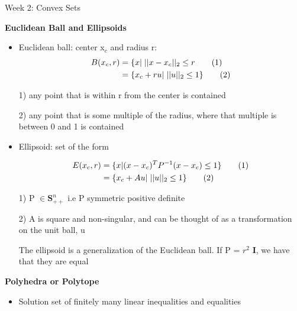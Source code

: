 \documentclass{article}
\begin{document}
\begin{homeworkProblemName}{{\LARGE Week 2: Convex Sets}}
\begin{problemAnswer}
{\begin{itemize}
      \end{itemize}
    }\end{problemAnswer}

  \clearpage

  \vspace{0.2 cm} \textbf{\large Euclidean Ball and Ellipsoids}

  \begin{problemAnswer}{
      \begin{itemize}
      \item Euclidean ball: center x$_c$ and radius r:
        \begin{align*}
          B(x_c, r) &= \{x | \hspace{0.1 cm} ||x-x_c||_2 \leq r \tag{1}\\
                    &= \{x_c + ru | \hspace{0.1 cm} ||u||_2 \leq 1\} \tag{2}\\
        \end{align*}

        1) any point that is within r from the center is contained

        2) any point that is some multiple of the radius, where that multiple is
        between 0 and 1 is contained

      \item Ellipsoid: set of the form

        \begin{align*}
          E(x_c, r) &= \{x | (x - x_c)^TP^{-1}(x-x_c) \leq 1\} \tag{1}\\
                    &= \{x_c + Au | \hspace{0.1 cm} ||u||_2 \leq 1\} \tag{2}\\
        \end{align*}

        1) P $\in \bm{S}^n_{++}$ i.e P symmetric positive definite

        2) A is square and non-singular, and can be thought of as a
        transformation on the unit ball, u

        The ellipsoid is a generalization of the Euclidean ball. If P = $r^2$
        $\bm{I}$, we have that they are equal
      \end{itemize}
    }\end{problemAnswer}


  \vspace{0.2 cm} \textbf{\large Polyhedra or Polytope}

  \begin{problemAnswer}{
      \begin{itemize}
      \item Solution set of finitely many linear inequalities and equalities


\end{itemize}}
\end{problemAnswer}
\end{homeworkProblemName}
\end{document}

